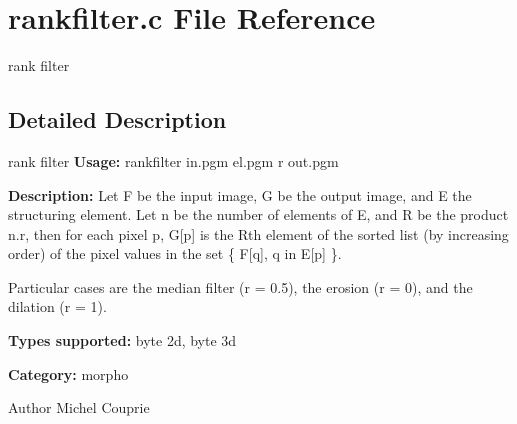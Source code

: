 \section{rankfilter.c File Reference}
\label{rankfilter_8c}


rank filter  




\subsection{Detailed Description}
rank filter {\bfseries Usage:} rankfilter in.pgm el.pgm r out.pgm

{\bfseries Description:} Let F be the input image, G be the output image, and E the structuring element. Let n be the number of elements of E, and R be the product n.r, then for each pixel p, G[p] is the Rth element of the sorted list (by increasing order) of the pixel values in the set \{ F[q], q in E[p] \}.

Particular cases are the median filter (r = 0.5), the erosion (r = 0), and the dilation (r = 1).

{\bfseries Types supported:} byte 2d, byte 3d

{\bfseries Category:} morpho

\begin{DoxyAuthor}{Author}
Michel Couprie 
\end{DoxyAuthor}
